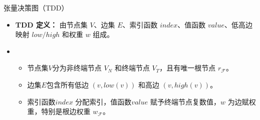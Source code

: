 \documentclass[aspectratio=1610]{ctexbeamer}
\begin{document}
\begin{frame}{张量决策图（TDD）}
    \begin{itemize}[itemsep=10pt]
        \item \textbf{TDD 定义：} 由节点集 $V$、边集 $E$、索引函数 $index$、值函数 $value$、低高边映射 $low/high$ 和权重 $w$ 组成。
        \item
        \begin{itemize}[itemsep=8pt,label=$\bullet$]
            \item 节点集$V$分为非终端节点 $V_N$ 和终端节点 $V_T$，且有唯一根节点 $r_{\mathcal{F}}$。
            \item 边集$E$包含所有低边 $\left(v,low(v)\right)$ 和高边 $\left(v,high(v)\right)$。
            \item 索引函数$index$ 分配索引，值函数$value$ 赋予终端节点复数值，$w$ 为边赋权重，特别是根边权重 $w_{\mathcal{F}}$。
        \end{itemize}
    \end{itemize}
\end{frame}
\end{document}
